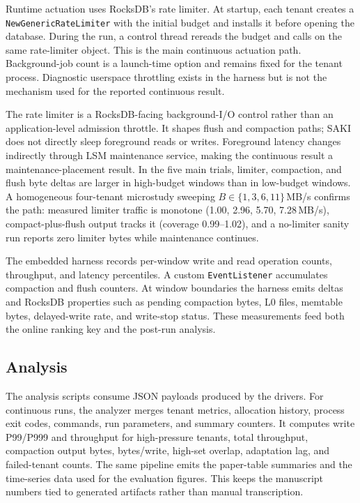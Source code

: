 Runtime actuation uses RocksDB's rate limiter. At startup, each tenant creates
a \texttt{NewGenericRateLimiter} with the initial budget and installs it before
opening the database. During the run, a control thread rereads the budget and
calls \ratecall on the same rate-limiter object. This is the main continuous
actuation path. Background-job count is a launch-time option and remains fixed
for the tenant process. Diagnostic userspace throttling exists in the harness
but is not the mechanism used for the reported continuous result.

The rate limiter is a RocksDB-facing background-I/O control rather than an
application-level admission throttle. It shapes flush and compaction paths;
SAKI does not directly sleep foreground reads or writes. Foreground latency
changes indirectly through LSM maintenance service, making the continuous
result a maintenance-placement result. In the five main trials, limiter,
compaction, and flush byte deltas are larger in high-budget windows than in
low-budget windows. A homogeneous four-tenant microstudy sweeping
\(B \in \{1,3,6,11\}\)\,MB/s confirms the path: measured limiter traffic is
monotone (1.00, 2.96, 5.70, 7.28\,MB/s), compact-plus-flush output tracks it
(coverage 0.99--1.02), and a no-limiter sanity run reports zero limiter bytes
while maintenance continues.

The embedded harness records per-window write and read operation counts,
throughput, and latency percentiles. A custom \texttt{EventListener} accumulates
compaction and flush counters. At window boundaries the harness emits deltas
and RocksDB properties such as pending compaction bytes, L0 files, memtable
bytes, delayed-write rate, and write-stop status. These measurements feed both
the online ranking key and the post-run analysis.

\subsection{Analysis}

The analysis scripts consume JSON payloads produced by the drivers. For
continuous runs, the analyzer merges tenant metrics, allocation history,
process exit codes, commands, run parameters, and summary counters. It computes
write P99/P999 and throughput for high-pressure tenants, total throughput,
compaction output bytes, bytes/write, high-set overlap, adaptation lag, and
failed-tenant counts. The same pipeline emits the paper-table summaries and the
time-series data used for the evaluation figures. This keeps the manuscript
numbers tied to generated artifacts rather than manual transcription.
